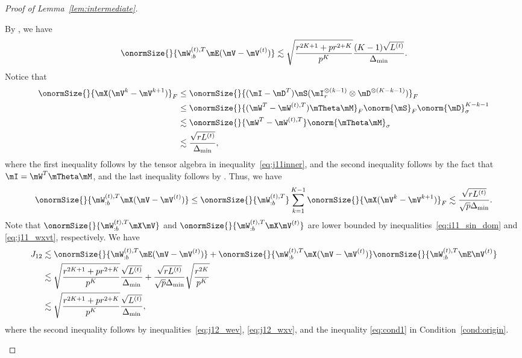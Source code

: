 \documentclass[lettersize,onecolumn,journal]{IEEEtran}
\theoremstyle{definition}
\theoremstyle{definition}
\begin{document}
\begin{proof}[Proof of Lemma~\ref{lem:intermediate}]
\begin{enumerate}
    By \citet[Proof of Lemma 5]{han2020exact}, we have 
    \begin{equation}\label{eq:j12_wev}
        \onormSize{}{\mW_{:b}^{(t),T} \mE (\mV-\mV^{(t)})} \lesssim \sqrt{ \frac{r^{2K+1} + p r^{2 + K}}{p^K} } \frac{(K-1)\sqrt{L^{(t)}}}{\Delta_{\min}}.
    \end{equation}
    Notice that 
    \begin{align}
        \onormSize{}{\mX (\mV^k-\mV^{k+1})}_F &\leq \onormSize{}{(\mI - \mD^T) \mS (\mI_r^{\otimes (k-1)} \otimes  \mD^{\otimes (K-k-1)})}_F \\
        &\leq \onormSize{}{(\mW^T - \mW^{(t),T}) \mTheta \mM}_F \onorm{\mS}_F \onorm{ \mD}_{\sigma}^{K-k-1}\\
        & \lesssim \onormSize{}{ \mW^T - \mW^{(t),T} } \onorm{\mTheta \mM}_{\sigma} \\
        & \lesssim \frac{ \sqrt{r L^{(t)}}}{\Delta_{\min}},
    \end{align}
    where the first inequality follows by the tensor algebra in 
    inequality~\eqref{eq:j11inner}, and the second inequality follows by the fact  that $\mI = \mW^T \mTheta \mM$, and the last inequality follows by \citet[Proof of Lemma 5]{han2020exact}. Thus, we have
    \begin{equation}
           \onormSize{}{\mW_{:b}^{(t),T} \mX (\mV-\mV^{(t)})}\leq \onormSize{}{\mW_{:b}^{(t),T} }  \sum_{k = 1}^{K-1} \onormSize{}{\mX (\mV^k-\mV^{k+1})}_F \lesssim \frac{ \sqrt{r L^{(t)}}}{\sqrt{p} \Delta_{\min}}.\label{eq:j12_wxv}
    \end{equation}
    Note that $\onormSize{}{\mW_{:b}^{(t),T} \mX \mV }$ and $\onormSize{}{\mW_{:b}^{(t),T} \mX \mV^{(t)} }$ are lower bounded by inequalities~\eqref{eq:i11_sin_dom} and \eqref{eq:j11_wxvt}, respectively. We have 
    \begin{align}
        J_{12} &\lesssim \onormSize{}{\mW_{:b}^{(t),T} \mE (\mV-\mV^{(t)})} + \onormSize{}{\mW_{:b}^{(t),T} \mX (\mV-\mV^{(t)})}\onormSize{}{\mW_{:b}^{(t),T} \mE \mV^{(t)} }\\
        &\lesssim \sqrt{ \frac{r^{2K+1} + p r^{2 + K}}{p^K} } \frac{\sqrt{L^{(t)}}}{\Delta_{\min}} + \frac{ \sqrt{r L^{(t)}}}{\sqrt{p} \Delta_{\min}} \sqrt{\frac{r^{2K}}{p^K}} \\
        & \lesssim  \sqrt{ \frac{r^{2K+1} + p r^{2 + K}}{p^K} } \frac{\sqrt{L^{(t)}}}{\Delta_{\min}},
    \end{align}
    where the second inequality follows by inequalities~\eqref{eq:j12_wev}, \eqref{eq:j12_wxv}, and the inequality \eqref{eq:cond1} in Condition~\ref{cond:origin}.
    


\end{enumerate}
\end{proof}
\end{document}
